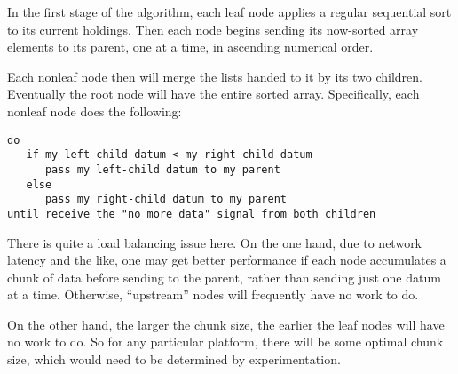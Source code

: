 In the first stage of the algorithm, each leaf node applies a regular
sequential sort to its current holdings. Then each node begins sending
its now-sorted array elements to its parent, one at a time, in ascending
numerical order.

Each nonleaf node then will merge the lists handed to it by its two
children.  Eventually the root node will have the entire sorted array.
Specifically, each nonleaf node does the following:

\begin{Verbatim}[fontsize=\relsize{-2}]
do
   if my left-child datum < my right-child datum
      pass my left-child datum to my parent
   else
      pass my right-child datum to my parent
until receive the "no more data" signal from both children
\end{Verbatim}

There is quite a load balancing issue here.  On the one hand, due to
network latency and the like, one may get better performance if each
node accumulates a chunk of data before sending to the parent, rather
than sending just one datum at a time.  Otherwise, ``upstream'' nodes
will frequently have no work to do.

On the other hand, the larger the chunk size, the earlier the leaf nodes
will have no work to do.  So for any particular platform, there will be
some optimal chunk size, which would need to be determined by
experimentation.

% 
% 
% 
% 
% 
% 
% 
% 
% 
% 
% 

